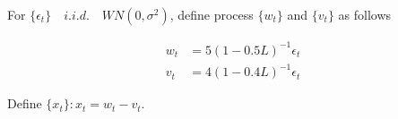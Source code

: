 For $\{\epsilon_t\} \quad i.i.d. \quad WN(0, \sigma^2)$, define process $\{w_t\}$ and $\{v_t\}$ as follows 

\begin{equation}
\nonumber
\begin{aligned}
w_t & = 5(1 - 0.5L)^{-1}\epsilon_t \\
v_t & = 4(1 - 0.4L)^{-1}\epsilon_t
\end{aligned}
\end{equation}

Define $\{x_t\} : x_t = w_t - v_t$.




